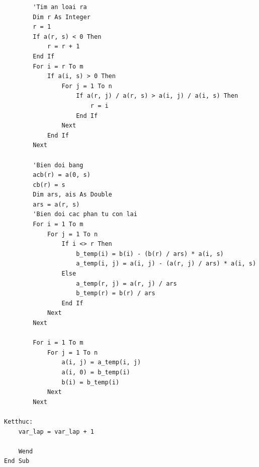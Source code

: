 {\begin{verbatim}
        'Tim an loai ra
        Dim r As Integer
        r = 1
        If a(r, s) < 0 Then
            r = r + 1
        End If
        For i = r To m
            If a(i, s) > 0 Then
                For j = 1 To n
                    If a(r, j) / a(r, s) > a(i, j) / a(i, s) Then
                        r = i
                    End If
                Next
            End If
        Next
        
        'Bien doi bang
        acb(r) = a(0, s)
        cb(r) = s
        Dim ars, ais As Double
        ars = a(r, s)
        'Bien doi cac phan tu con lai
        For i = 1 To m
            For j = 1 To n
                If i <> r Then
                    b_temp(i) = b(i) - (b(r) / ars) * a(i, s)
                    a_temp(i, j) = a(i, j) - (a(r, j) / ars) * a(i, s)
                Else
                    a_temp(r, j) = a(r, j) / ars
                    b_temp(r) = b(r) / ars
                End If
            Next
        Next
        
        For i = 1 To m
            For j = 1 To n
                a(i, j) = a_temp(i, j)
                a(i, 0) = b_temp(i)
                b(i) = b_temp(i)
            Next
        Next
        
Ketthuc:
    var_lap = var_lap + 1

    Wend
End Sub
\end{verbatim}
}
